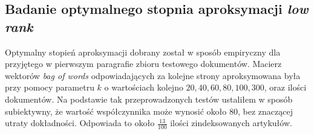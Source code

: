\documentclass{article}
\begin{document}
        \subsection{Badanie optymalnego stopnia aproksymacji \textit{low rank}}
        Optymalny stopień aproksymacji dobrany został w sposób empiryczny dla przyjętego w pierwszym paragrafie zbioru testowego dokumentów. Macierz wektorów \textit{bag of words} odpowiadających za kolejne strony aproksymowana była przy pomocy parametru $k$ o wartościach kolejno ${20,40,60,80,100,300}$, oraz ilości dokumentów. Na podstawie tak przeprowadzonych testów ustaliłem w sposób subiektywny, że wartość współczynnika może wynosić około $80$, bez znaczącej utraty dokładności. Odpowiada to około $\frac{13}{100}$ ilości zindeksowanych artykułów. 
        
        \newpage
        \begin{figure}[h!]
            \centering

\end{figure}
\end{document}
